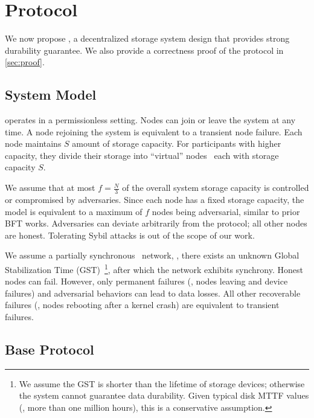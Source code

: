\section{\sys Protocol}
\label{sec:protocol}

We now propose \sys, a decentralized storage system design that provides strong durability guarantee.
We also provide a correctness proof of the protocol in \autoref{sec:proof}.

\subsection{System Model}
\label{sec:protocol:model}

\sys operates in a permissionless setting.
Nodes can join or leave the system at any time.
A node rejoining the system is equivalent to a transient node failure.
Each node maintains $S$ amount of storage capacity.
For participants with higher capacity, they divide their storage into ``virtual'' nodes~\cite{chord} each with storage capacity $S$.

We assume that at most $f = \frac{N}{3}$ of the overall system storage capacity is controlled or compromised by adversaries.
Since each node has a fixed storage capacity, the model is equivalent to a maximum of $f$ nodes being adversarial, similar to prior BFT works.
Adversaries can deviate arbitrarily from the protocol;
all other nodes are honest.
Tolerating Sybil attacks is out of the scope of our work.

We assume a partially synchronous~\cite{partial_synchrony} network, \ie, there exists an unknown Global Stabilization Time (GST)~\footnote{
We assume the GST is shorter than the lifetime of storage devices;
otherwise the system cannot guarantee data durability.
Given typical disk MTTF values (\eg, more than one million hours), this is a conservative assumption.
}, after which the network exhibits synchrony.
Honest nodes can fail.
However, only permanent failures (\eg, nodes leaving and device failures) and adversarial behaviors can lead to data losses.
All other recoverable failures (\eg, nodes rebooting after a kernel crash) are equivalent to transient failures.

\subsection{Base Protocol}
\label{sec:protocol:base}

